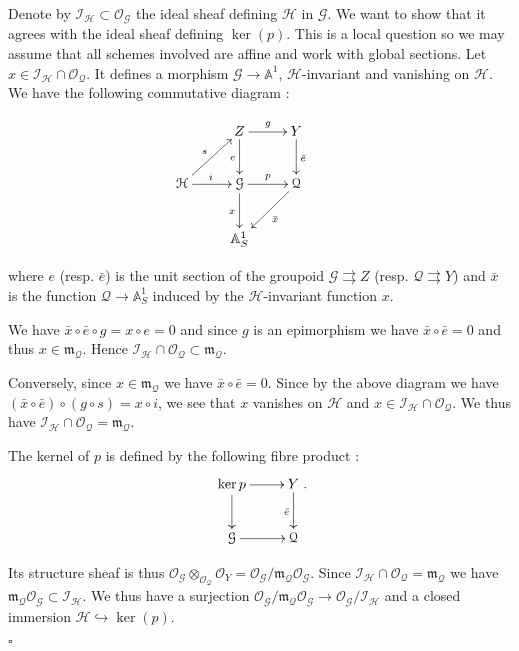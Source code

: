 \documentclass{amsart}
\newenvironment{demo}{{\flushleft \bf Proof~:}}{\hfill $\square$ \vspace{5mm}}
\theoremstyle{definition}
\theoremstyle{remark}
\begin{document}
\begin{demo}

Denote by ${{\mathcal I}}_{{\mathcal H}} \subset {{\mathcal O}}_{{\mathcal G}}$ the ideal sheaf defining ${{\mathcal H}}$ in ${{\mathcal G}}$. We want to show that it agrees with the ideal sheaf defining $\ker(p)$. This is a local question so we may assume that all schemes involved are affine and work with global sections. Let $x \in {{\mathcal I}}_{{\mathcal H}} \cap {{\mathcal O}}_{{\mathcal Q}}$. It defines a morphism ${{\mathcal G}} {\longrightarrow} {\mathbb{A}}^1$, ${{\mathcal H}}$-invariant and vanishing on ${{\mathcal H}}$. We have the following commutative diagram : 

 \[ \xymatrix{ & Z \ar[r]^g \ar[d]_{e} & Y \ar[d]^{\bar{e}}   \\ {{\mathcal H}} \ar[r]^i \ar[ur]^{s} & {{\mathcal G}} \ar[d]_x \ar[r]^p  & {{\mathcal Q}} \ar[ld]^{\bar{x}} \\ & {\mathbb{A}}^1_S & &} \]
  
where $e$ (resp. $\bar{e}$) is the unit section of the groupoid ${{\mathcal G}} {\rightrightarrows} Z$ (resp. ${{\mathcal Q}} {\rightrightarrows} Y$) and $\bar{x}$ is the function ${{\mathcal Q}} {\longrightarrow} {\mathbb{A}}^1_S$ induced by the ${{\mathcal H}}$-invariant function $x$. 

We have $\bar{x}\circ \bar{e} \circ g = x \circ e = 0$ and since $g$ is an epimorphism we have $\bar{x} \circ \bar{e} = 0$ and thus $x \in {{\mathfrak m}}_{{\mathcal Q}}$. Hence ${{\mathcal I}}_{{\mathcal H}} \cap {{\mathcal O}}_{{\mathcal Q}} \subset {{\mathfrak m}}_{{\mathcal Q}}$. 

Conversely, since $x \in {{\mathfrak m}}_{{\mathcal Q}}$ we have $\bar{x} \circ \bar{e} = 0$. Since by the above diagram we have $(\bar{x} \circ \bar{e}) \circ (g \circ s) = x \circ i$, we see that $x$ vanishes on ${{\mathcal H}}$ and $x \in {{\mathcal I}}_{{\mathcal H}} \cap {{\mathcal O}}_{{\mathcal Q}}$. We thus have ${{\mathcal I}}_{{\mathcal H}} \cap {{\mathcal O}}_{{\mathcal Q}} = {{\mathfrak m}}_{{\mathcal Q}}$. 

The kernel of $p$ is defined by the following fibre product : 
\[ \xymatrix{ \ker p \ar[d] \ar[r] & Y \ar[d]_{\bar{e}} \\ {{\mathcal G}} \ar[r] & {{\mathcal Q}}}. \]

Its structure sheaf is thus ${{\mathcal O}}_{{\mathcal G}} \otimes_{{{\mathcal O}}_{{\mathcal Q}}} {{\mathcal O}}_Y = {{\mathcal O}}_{{\mathcal G}} / {{\mathfrak m}}_{{\mathcal Q}} {{\mathcal O}}_{{\mathcal G}}$. Since ${{\mathcal I}}_{{\mathcal H}} \cap {{\mathcal O}}_{{\mathcal Q}} = {{\mathfrak m}}_{{\mathcal Q}}$ we have ${{\mathfrak m}}_{{\mathcal Q}} {{\mathcal O}}_{{\mathcal G}} \subset {{\mathcal I}}_{{\mathcal H}}$. We thus have a surjection ${{\mathcal O}}_{{\mathcal G}} / {{\mathfrak m}}_{{\mathcal Q}} {{\mathcal O}}_{{\mathcal G}} {\longrightarrow} {{\mathcal O}}_{{\mathcal G}} / {{\mathcal I}}_{{\mathcal H}}$ and a closed immersion ${{\mathcal H}} {\hookrightarrow} \ker(p)$.


\end{demo}
\end{document}
